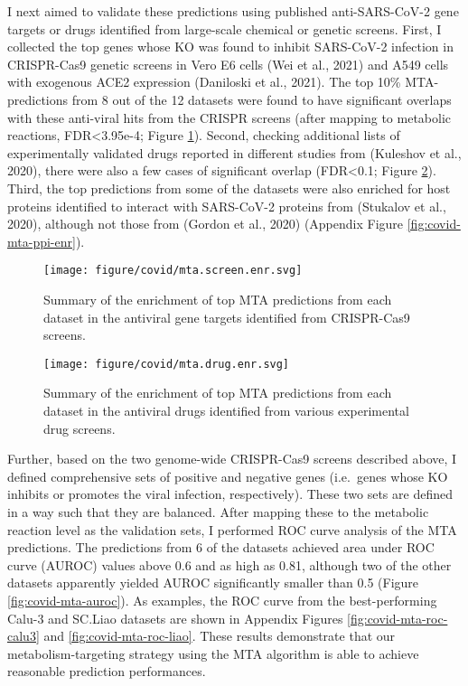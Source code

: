\documentclass[12pt,twoside,openany,\mydriver]{thesis}  %
\begin{document}
I next aimed to validate these predictions using published anti-SARS-CoV-2 gene targets or drugs identified from large-scale chemical or genetic screens. First, I collected the top genes whose KO was found to inhibit SARS-CoV-2 infection in CRISPR-Cas9 genetic screens in Vero E6 cells (Wei et al., 2021) and A549 cells with exogenous ACE2 expression (Daniloski et al., 2021). The top 10\% MTA-predictions from 8 out of the 12 datasets were found to have significant overlaps with these anti-viral hits from the CRISPR screens (after mapping to metabolic reactions, FDR\textless{}3.95e-4; Figure \ref{fig:covid-mta-genetic-enr}). Second, checking additional lists of experimentally validated drugs reported in different studies from (Kuleshov et al., 2020), there were also a few cases of significant overlap (FDR\textless{}0.1; Figure \ref{fig:covid-mta-drug-enr}). Third, the top predictions from some of the datasets were also enriched for host proteins identified to interact with SARS-CoV-2 proteins from (Stukalov et al., 2020), although not those from (Gordon et al., 2020) (Appendix Figure \ref{fig:covid-mta-ppi-enr}).
\begin{figure}
\texttt{[image: figure/covid/mta.screen.enr.svg]} \caption{Summary of the enrichment of top MTA predictions from each dataset in the antiviral gene targets identified from CRISPR-Cas9 screens.}\label{fig:covid-mta-genetic-enr}
\end{figure}
\begin{figure}
\texttt{[image: figure/covid/mta.drug.enr.svg]} \caption{Summary of the enrichment of top MTA predictions from each dataset in the antiviral drugs identified from various experimental drug screens.}\label{fig:covid-mta-drug-enr}
\end{figure}
Further, based on the two genome-wide CRISPR-Cas9 screens described above, I defined comprehensive sets of positive and negative genes (i.e.~genes whose KO inhibits or promotes the viral infection, respectively). These two sets are defined in a way such that they are balanced. After mapping these to the metabolic reaction level as the validation sets, I performed ROC curve analysis of the MTA predictions. The predictions from 6 of the datasets achieved area under ROC curve (AUROC) values above 0.6 and as high as 0.81, although two of the other datasets apparently yielded AUROC significantly smaller than 0.5 (Figure \ref{fig:covid-mta-auroc}). As examples, the ROC curve from the best-performing Calu-3 and SC.Liao datasets are shown in Appendix Figures \ref{fig:covid-mta-roc-calu3} and \ref{fig:covid-mta-roc-liao}. These results demonstrate that our metabolism-targeting strategy using the MTA algorithm is able to achieve reasonable prediction performances.
\end{document}
